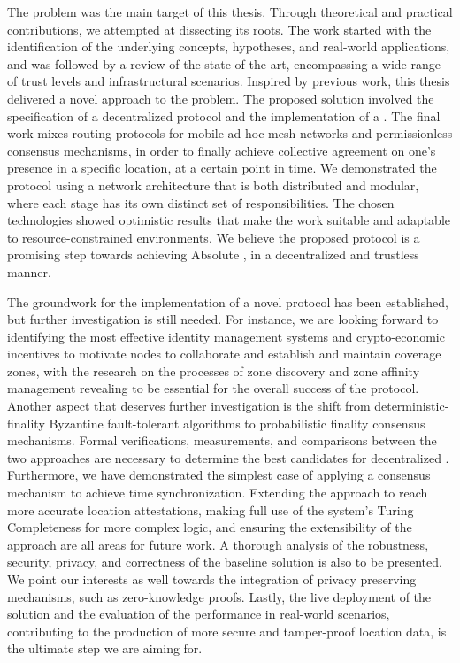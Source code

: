 The \pol{} problem was the main target of this thesis. Through theoretical and practical contributions, we attempted at dissecting its roots. The work started with the identification of the underlying concepts, hypotheses, and real-world applications, and was followed by a review of the state of the art, encompassing a wide range of trust levels and infrastructural scenarios. Inspired by previous work, this thesis delivered a novel approach to the problem. The proposed solution involved the specification of a decentralized \pol{} protocol and the implementation of a \poc{}. The final work mixes routing protocols for mobile ad hoc mesh networks and permissionless consensus mechanisms, in order to finally achieve collective agreement on one's presence in a specific location, at a certain point in time. We demonstrated the protocol using a network architecture that is both distributed and modular, where each stage has its own distinct set of responsibilities. The chosen technologies showed optimistic results that make the work suitable and adaptable to resource-constrained environments. We believe the proposed protocol is a promising step towards achieving Absolute \pol{}, in a decentralized and trustless manner.

The groundwork for the implementation of a novel \pol{} protocol has been established, but further investigation is still needed. For instance, we are looking forward to identifying the most effective identity management systems and crypto-economic incentives to motivate nodes to collaborate and establish and maintain coverage zones, with the research on the processes of zone discovery and zone affinity management revealing to be essential for the overall success of the protocol. Another aspect that deserves further investigation is the shift from deterministic-finality Byzantine fault-tolerant algorithms to probabilistic finality consensus mechanisms. Formal verifications, measurements, and comparisons between the two approaches are necessary to determine the best candidates for decentralized \pol{}. Furthermore, we have demonstrated the simplest case of applying a consensus mechanism to achieve time synchronization. Extending the approach to reach more accurate location attestations, making full use of the system's Turing Completeness for more complex logic, and ensuring the extensibility of the approach are all areas for future work. A thorough analysis of the robustness, security, privacy, and correctness of the baseline solution is also to be presented. We point our interests as well towards the integration of privacy preserving mechanisms, such as zero-knowledge proofs. Lastly, the live deployment of the solution and the evaluation of the performance in real-world scenarios, contributing to the production of more secure and tamper-proof location data, is the ultimate step we are aiming for.


